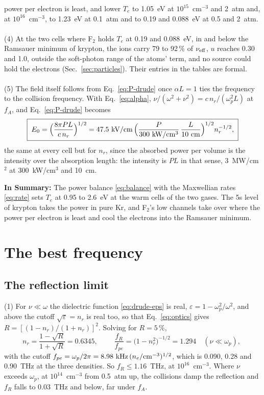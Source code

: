 \documentclass[11pt]{article}
\numberwithin{equation}{section}
\newcommand{\nueff}{\nu_{\rm eff}}
\newcommand{\Te}{T_e}
\begin{document}
power per electron is least, and lower $\Te$ to 1.05~eV at $10^{15}$~cm$^{-3}$ and 2~atm
and, at $10^{16}$~cm$^{-3}$, to 1.23~eV at 0.1~atm and to 0.19 and 0.088~eV at 0.5 and
2~atm.
\\ \\
{\noindent}(4) At the two cells where F$_2$ holds $\Te$ at 0.19 and 0.088~eV, in and below
the Ramsauer minimum of krypton, the ions carry 79 to 92\,\% of $\nueff$, $u$ reaches 0.30
and 1.0, outside the soft-photon range of the atoms' term, and no source could hold the
electrons (Sec.~\ref{sec:particles}). Their entries in the tables are formal.
\\ \\
{\noindent}(5) The field itself follows from Eq.~\eqref{eq:P-drude} once
$\alpha L=1$ ties the frequency to the collision frequency. With Eq.~\eqref{eq:alpha},
$\nu/(\omega^2+\nu^2)=c\,n_r/(\omega_p^2L)$ at $f_A$, and Eq.~\eqref{eq:P-drude} becomes
\begin{equation}
\boxed{\;E_0=\Big(\frac{8\pi PL}{c\,n_r}\Big)^{1/2}
=47.5~{\rm kV/cm}\,\Big(\frac{P}{300~{\rm kW/cm^3}}\,\frac{L}{10~{\rm cm}}\Big)^{1/2}n_r^{-1/2},\;}
\label{eq:E0}
\end{equation}
the same at every cell but for $n_r$, since the absorbed power per volume is the
intensity over the absorption length: the intensity is $PL$ in that sense, 3~MW/cm$^2$ at
300~kW/cm$^3$ and 10~cm.

\medskip
\noindent\textbf{In Summary:} The power balance \eqref{eq:balance} with the Maxwellian
rates \eqref{eq:rate} sets $\Te$ at 0.95 to 2.6~eV at the warm cells of the two gases.
The 5s level of krypton takes the power in pure Kr, and F$_2$'s low channels take over
where the power per electron is least and cool the electrons into the Ramsauer minimum.


\section{The best frequency}
\label{sec:freq}

\subsection{The reflection limit}
\label{sec:reflection}
{\noindent}(1) For $\nu\ll\omega$ the dielectric function \eqref{eq:drude-eps} is real,
$\varepsilon=1-\omega_p^2/\omega^2$, and above the cutoff $\sqrt\varepsilon=n_r$ is real
too, so that Eq.~\eqref{eq:optics} gives $R=[(1-n_r)/(1+n_r)]^2$. Solving for $R=5\,\%$,
\begin{equation}
n_r=\frac{1-\sqrt R}{1+\sqrt R}=0.6345,\qquad
\boxed{\;\frac{f_R}{f_{pe}}=\big(1-n_r^2\big)^{-1/2}=1.294\quad(\nu\ll\omega_p),\;}
\label{eq:fR}
\end{equation}
with the cutoff $f_{pe}=\omega_p/2\pi=8.98~{\rm kHz}\,(n_e/{\rm cm^{-3}})^{1/2}$, which is
0.090, 0.28 and 0.90~THz at the three densities. So $f_R\le1.16$~THz, at $10^{16}$~cm$^{-3}$.
Where $\nu$ exceeds $\omega_p$, at $10^{14}$~cm$^{-3}$ from 0.5~atm up, the collisions damp
the reflection and $f_R$ falls to 0.03~THz and below, far under $f_A$.
\end{document}
